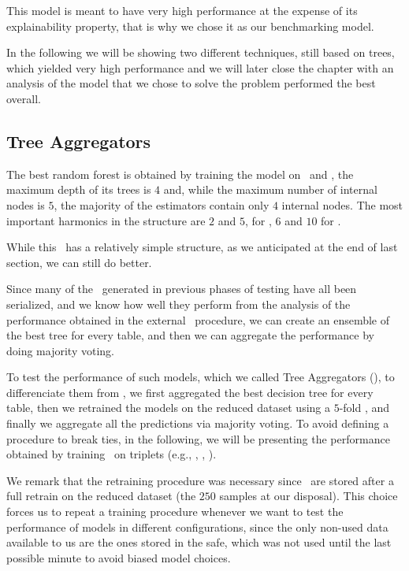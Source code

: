 This model is meant to have very high performance at the expense of its explainability property,
that is why we chose it as our benchmarking model.

In the following we will be showing two different techniques, still based on trees, which yielded
very high performance and we will later close the chapter with an analysis of the model that we
chose to solve the problem performed the best overall.


\subsection{Tree Aggregators}
\label{sec:qrp-ta}
The best random forest is obtained by training the model on \an\ and \cnmod, the maximum depth of
its trees is $4$ and, while the maximum number of internal nodes is $5$, the majority of the
estimators contain only $4$ internal nodes. The most important harmonics in the structure are $2$ and $5$, for \cnmod, $6$ and $10$ for \phin.

While this \rf\ has a relatively simple structure, as we anticipated at the end of last section, we
can still do better.

Since many of the \dts\ generated in previous phases of testing have all been serialized, and we
know how well they perform from the analysis of the performance obtained in the external \cv\
procedure, we can create an ensemble of the best tree for every table, and then we can aggregate the
performance by doing majority voting.

To test the performance of such models, which we called Tree Aggregators (\tas), to differenciate them from
\rfs, we first aggregated the best decision tree for every table, then we retrained the
models on the reduced dataset using a $5$-fold \cv, and finally we aggregate all the predictions via
majority voting. To avoid defining a procedure to break ties, in the following, we will be
presenting the performance obtained by training \tas\ on triplets (e.g., \an, \bn, \cnmod).

We remark that the retraining procedure was necessary since \dts\ are stored after a full retrain on
the reduced dataset (the $250$ samples at our disposal). This choice forces us to repeat a
training procedure whenever we want to test the performance of models in different configurations,
since the only non-used data available to us are the ones stored in the safe, which was not used
until the last possible minute to avoid biased model choices.


